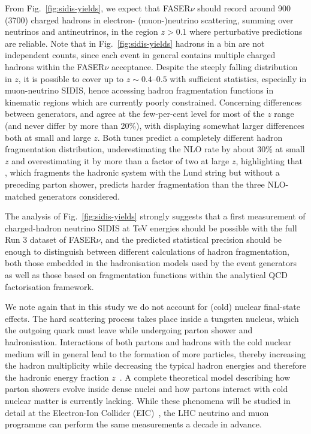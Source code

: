 From Fig.~\ref{fig:sidis-yields}, we expect that FASER$\nu$ should record around 900 (3700) charged hadrons in electron- (muon-)neutrino scattering, summing over neutrinos and antineutrinos, in the region $z>0.1$ where perturbative predictions are reliable.
%
Note that in Fig.~\ref{fig:sidis-yields} hadrons in a bin are not independent counts, since each event in general contains multiple charged hadrons within the FASER$\nu$ acceptance. 
%
Despite the steeply falling distribution in $z$, it is possible to cover up to $z\sim 0.4$--$0.5$ with sufficient statistics, especially in muon-neutrino SIDIS, hence accessing hadron fragmentation functions in kinematic regions which are currently poorly constrained. 
%
Concerning differences between generators,  \powhegtwo and \herwig agree at the few-per-cent level for most of the $z$ range (and never differ by more than 20\%), with \sherpa displaying somewhat larger differences both at small and large $z$.
%
Both \genie tunes predict a completely different hadron fragmentation distribution, underestimating the NLO rate by about 30\% at small $z$ and overestimating it by more than a factor of two at large $z$, highlighting that \genie, which fragments the hadronic system with the Lund string but without a preceding parton shower, predicts harder fragmentation than the three NLO-matched generators considered. 

The analysis of Fig.~\ref{fig:sidis-yields} strongly suggests that a first measurement of charged-hadron neutrino SIDIS at TeV energies should be possible with the full Run 3 dataset of FASER$\nu$, and the predicted statistical precision should be enough to distinguish between different calculations of hadron fragmentation, both those embedded in the hadronisation models used by the event generators as well as those based on fragmentation functions within the analytical QCD factorisation framework. 

We note again that in this study we do not account for (cold) nuclear final-state effects. 
%
The hard scattering process takes place inside a tungsten nucleus, which the outgoing quark must leave while undergoing parton shower and hadronisation. 
%
Interactions of both partons and hadrons with the cold nuclear medium will in general lead to the formation of more particles, thereby increasing the hadron multiplicity while decreasing the typical hadron energies and therefore the hadronic energy fraction $z$~\cite{Doradau:2024wli,deFlorian:2011fp}.
%
A complete theoretical model describing how parton showers evolve inside dense nuclei and how partons interact with cold nuclear matter is currently lacking. 
%
While these phenomena will be studied in detail at the Electron-Ion Collider (EIC)~\cite{Accardi:2012qut,AbdulKhalek:2021gbh}, the LHC neutrino and muon programme can perform the same measurements a decade in advance.